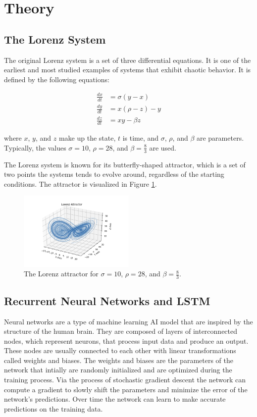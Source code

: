 \documentclass[11pt]{article}
\begin{document}
\section{Theory}

\subsection{The Lorenz System}

The original Lorenz system is a set of three differential equations. It is one of the earliest and most studied examples of systems that exhibit chaotic behavior. It is defined by the following equations:

\begin{align}
\frac{dx}{dt} &= \sigma(y - x) \\
\frac{dy}{dt} &= x(\rho - z) - y \\
\frac{dz}{dt} &= xy - \beta z
\end{align}

where $x$, $y$, and $z$ make up the state, $t$ is time, and $\sigma$, $\rho$, and $\beta$ are parameters. Typically, the values $\sigma = 10$, $\rho = 28$, and $\beta = \frac{8}{3}$ are used.

The Lorenz system is known for its butterfly-shaped attractor, which is a set of two points the systems tends to evolve around, regardless of the starting conditions. The attractor is visualized in Figure \ref{fig:lorenz_attractor}.

\begin{figure}[h]
\centering
\includegraphics[width=0.5\textwidth]{lorenz_attractor.png}
\caption{The Lorenz attractor for $\sigma = 10$, $\rho = 28$, and $\beta = \frac{8}{3}$.}
\label{fig:lorenz_attractor}
\end{figure}

\subsection{Recurrent Neural Networks and LSTM}

Neural networks are a type of machine learning AI model that are inspired by the structure of the human brain. They are composed of layers of interconnected nodes, which represent neurons, that process input data and produce an output. These nodes are usually connected to each other with linear transformations called weights and biases. The weights and biases are the parameters of the network that intially are randomly initialized and are optimized during the training process. Via the process of stochastic gradient descent the network can compute a gradient to slowly shift the parameters and minimize the error of the network's predictions. Over time the network can learn to make accurate predictions on the training data.
\end{document}
